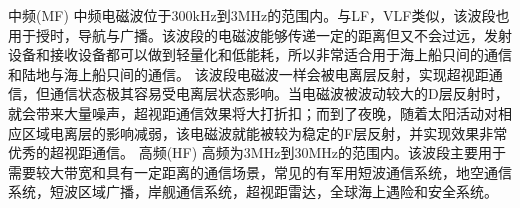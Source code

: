 \documentclass[UTF8]{article}
\begin{document}
\begin{CJK}{UTF8}{gkai}
 中频(MF)
中频电磁波位于300kHz到3MHz的范围内。与LF，VLF类似，该波段也用于授时，导航与广播。该波段的电磁波能够传递一定的距离但又不会过远，发射设备和接收设备都可以做到轻量化和低能耗，所以非常适合用于海上船只间的通信和陆地与海上船只间的通信。
该波段电磁波一样会被电离层反射，实现超视距通信，但通信状态极其容易受电离层状态影响。当电磁波被波动较大的D层反射时，就会带来大量噪声，超视距通信效果将大打折扣；而到了夜晚，随着太阳活动对相应区域电离层的影响减弱，该电磁波就能被较为稳定的F层反射，并实现效果非常优秀的超视距通信。
 高频(HF)
高频为3MHz到30MHz的范围内。该波段主要用于需要较大带宽和具有一定距离的通信场景，常见的有军用短波通信系统，地空通信系统，短波区域广播，岸舰通信系统，超视距雷达，全球海上遇险和安全系统。
\end{CJK}
\end{document}
